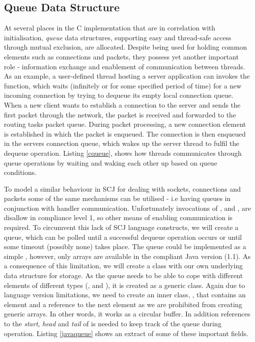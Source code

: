\subsection{Queue Data Structure} %
\label{sub:queue}
At several places in the C implementation that are in correlation with initialisation, \textit{queue} data structures, supporting easy and thread-safe access through mutual exclusion, are allocated. Despite being used for holding common elements such as connections and packets, they possess yet another important role - information exchange and enablement of communication between threads. As an example, a user-defined thread hosting a server application can invokes the  function, which waits (infinitely or for some specified period of time) for a new incoming connection by trying to dequeue its empty local connection queue. When a new client wants to establish a connection to the server and sends the first packet through the network, the packet is received and forwarded to the routing tasks packet queue. During packet processing, a new connection element is established in which the packet is enqueued. The connection is then enqueued in the servers connection queue, which wakes up the server thread to fulfil the dequeue operation. Listing \ref{cqueue}, shows how threads communicates through queue operations by waiting and waking each other up based on queue conditions.



To model a similar behaviour in SCJ for dealing with sockets, connections and packets some of the same mechanisms can be utilised - i.e having queues in conjunction with handler communication. Unfortunately invocations of ,  and , are disallow in compliance level 1, so other means of enabling communication is required. To circumvent this lack of SCJ language constructs, we will create a queue, which can be polled until a successful dequeue operation occurs or until some timeout (possibly none) takes place. The queue could be implemented as a simple , however, only arrays are available in the compliant Java version (1.1). As a consequence of this limitation, we will create a  class with our own underlying data structure for storage. As the queue needs to be able to cope with different elements of different types (,  and ), it is created as a generic class. Again due to language version limitations, we need to create an inner class, , that contains an element and a reference to the next element as we are prohibited from creating generic arrays. In other words, it works as a circular buffer. In addition references to the \textit{start}, \textit{head} and \textit{tail} of is needed to keep track of the queue during operation. Listing \ref{javaqueue} shows an extract of some of these important fields.

